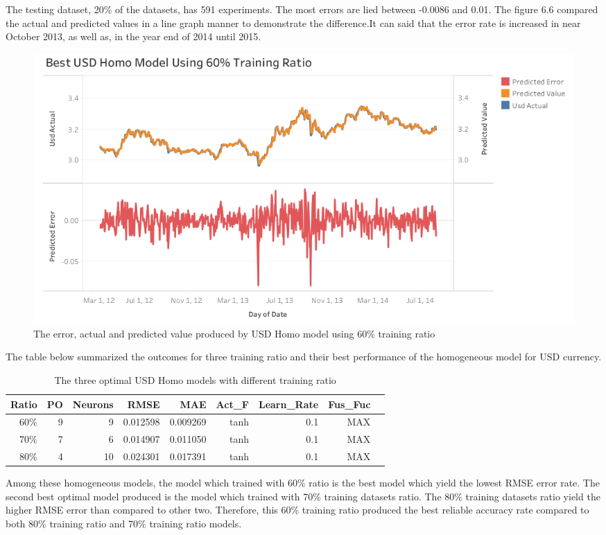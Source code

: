 {{{The testing dataset, 20\% of the datasets, has 591 experiments. The most errors are lied between -0.0086 and 0.01. The figure 6.6 compared the actual and predicted values in a line graph manner to demonstrate the difference.It can said that the error rate is increased in near October 2013, as well as, in the year end of 2014 until 2015.\\

\begin{figure}[hbt!]\centering
	\includegraphics[width=1\textwidth]{best_usd_homo_APV_60}
	\caption{The error, actual and predicted value produced by USD Homo model using 60\% training ratio}
\end{figure}

The table below summarized the outcomes for three training ratio and their best performance of the homogeneous model for USD currency.

\setlength{\tabcolsep}{0.5em} %
{\renewcommand{\arraystretch}{1.2}
	
	\begin{table}[ht]
		\centering
		\begin{tabular}{@{}rrrrrrrrr@{}}
			\toprule
		\textbf{Ratio}&\textbf{PO}&\textbf{Neurons}& \textbf{RMSE} & \textbf{MAE} & \textbf{Act\_F} & \textbf{Learn\_Rate} &\textbf{ Fus\_Fuc}\\ 
			\midrule
		60\% & 9 & 9 & 0.012598 & 0.009269 & tanh & 0.1 & MAX \\
		70\% & 7 & 6 & 0.014907 & 0.011050 & tanh & 0.1 & MAX \\ 	
		80\% & 4 & 10 & 0.024301 & 0.017391 & tanh & 0.1& MAX \\
		\hline
	\end{tabular}
	\hspace*{1cm}
	\caption{The three optimal USD Homo models with different training ratio}
	
\end{table}
Among these homogeneous models, the model which trained with 60\% ratio is the best model which yield the lowest RMSE error rate. The second best optimal model produced is the model which trained with 70\% training datasets ratio. The 80\% training datasets ratio yield the higher RMSE error than compared to other two. Therefore, this 60\% training ratio produced the best reliable accuracy rate compared to both  80\% training ratio  and 70\% training ratio models.

}}}}
